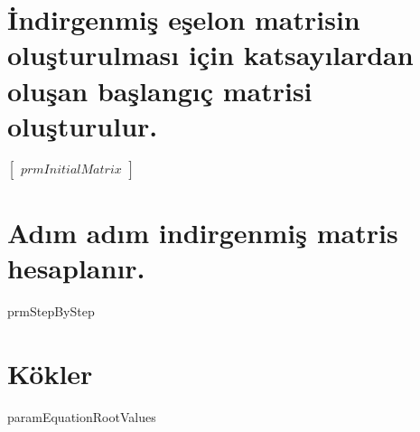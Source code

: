 \documentclass{article}
\begin{document}
\section{İndirgenmiş eşelon matrisin oluşturulması için katsayılardan oluşan başlangıç matrisi oluşturulur.}
\begin{center}
$\begin{bmatrix}
prmInitialMatrix
\end{bmatrix} $
\end{center}

\section{Adım adım indirgenmiş matris hesaplanır.}
\begin{center}
prmStepByStep
\end{center}

\section{Kökler}
paramEquationRootValues
\end{document}
